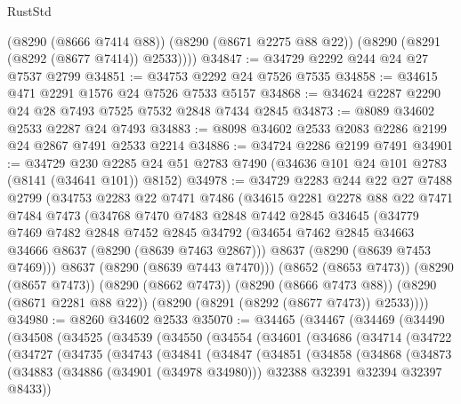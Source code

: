\begin{lexlean}{RustStd}
\begin{coremodule}
        (@8290 (@8666 @7414 @88))
        (@8290 (@8671 @2275 @88 @22))
        (@8290 (@8291 (@8292 (@8677 @7414)) @2533))))
@34847 := @34729 @2292 @244 @24 @27 @7537 @2799
@34851 := @34753 @2292 @24 @7526 @7535
@34858 := @34615 @471 @2291 @1576 @24 @7526 @7533 @5157
@34868 := @34624 @2287 @2290 @24 @28 @7493 @7525 @7532 @2848 @7434 @2845
@34873 := @8089 @34602 @2533 @2287 @24 @7493
@34883 := @8098 @34602 @2533 @2083 @2286 @2199 @24 @2867 @7491 @2533 @2214
@34886 := @34724 @2286 @2199 @7491
@34901 := @34729
    @230
    @2285
    @24
    @51
    @2783
    @7490
    (@34636 @101 @24 @101 @2783 (@8141 (@34641 @101)) @8152)
@34978 := @34729
    @2283
    @244
    @22
    @27
    @7488
    @2799
    (@34753
      @2283
      @22
      @7471
      @7486
      (@34615
        @2281
        @2278
        @88
        @22
        @7471
        @7484
        @7473
        (@34768
          @7470
          @7483
          @2848
          @7442
          @2845
          @34645
          (@34779
            @7469
            @7482
            @2848
            @7452
            @2845
            @34792
            (@34654 @7462 @2845 @34663 @34666 @8637 (@8290 (@8639 @7463 @2867)))
            @8637
            (@8290 (@8639 @7453 @7469)))
          @8637
          (@8290 (@8639 @7443 @7470)))
        (@8652 (@8653 @7473))
        (@8290 (@8657 @7473))
        (@8290 (@8662 @7473))
        (@8290 (@8666 @7473 @88))
        (@8290 (@8671 @2281 @88 @22))
        (@8290 (@8291 (@8292 (@8677 @7473)) @2533))))
@34980 := @8260 @34602 @2533
@35070 := @34465
    (@34467
      (@34469
        (@34490
          (@34508
            (@34525
              (@34539
                (@34550
                  (@34554
                    (@34601
                      (@34686
                        (@34714
                          (@34722
                            (@34727
                              (@34735
                                (@34743
                                  (@34841
                                    (@34847
                                      (@34851
                                        (@34858
                                          (@34868
                                            (@34873
                                              (@34883
                                                (@34886 (@34901 (@34978 @34980)))
                                                @32388
                                                @32391
                                                @32394
                                                @32397
                                                @8433))

\end{coremodule}
\end{lexlean}
